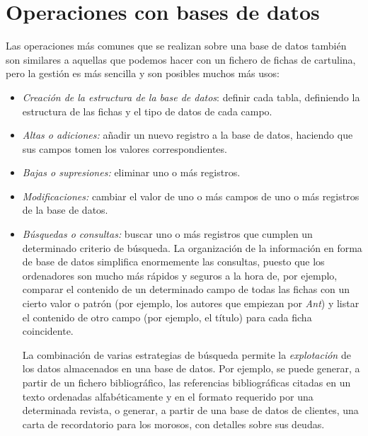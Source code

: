 \section{Operaciones con bases de datos} 

Las operaciones más comunes que se realizan sobre una base de datos también son similares a aquellas que podemos hacer con un fichero de fichas de cartulina, pero la gestión es más sencilla y son posibles muchos más usos: \begin{itemize} \item \emph{Creación de la estructura de la base de datos}: definir cada tabla, definiendo la estructura de las fichas y el tipo de datos de cada campo. \item \emph{Altas o adiciones:} añadir un nuevo registro a la base de datos, haciendo que sus campos tomen los valores correspondientes. \item \emph{Bajas o supresiones:} eliminar uno o más registros. \item \emph{Modificaciones:} cambiar el valor de uno o más campos de uno o más registros de la base de datos. \item \emph{Búsquedas o consultas:} buscar uno o más registros que cumplen un determinado criterio de búsqueda. La organización de la información en forma de base de datos simplifica enormemente las consultas, puesto que los ordenadores son mucho más rápidos y seguros a la hora de, por ejemplo, comparar el contenido de un determinado campo de todas las fichas con un cierto valor o patrón (por ejemplo, los autores que empiezan por \emph{Ant}) y listar el contenido de otro campo (por ejemplo, el título) para cada ficha coincidente. 

La combinación de varias estrategias de búsqueda permite la \emph{explotación} de los datos almacenados en una base de datos. Por ejemplo, se puede generar, a partir de un fichero bibliográfico, las referencias bibliográficas citadas en un texto ordenadas alfabéticamente y en el formato requerido por una determinada revista, o generar, a partir de una base de datos de clientes, una carta de recordatorio para los morosos, con detalles sobre sus deudas. 


\end{itemize}
